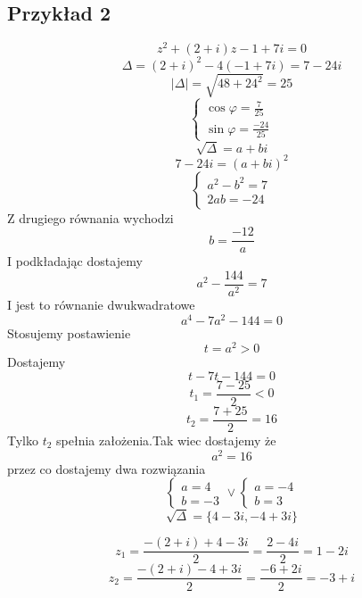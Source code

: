 \documentclass[11pt]{article}
\begin{document}
\subsection{Przykład 2}
$$ z^2 + (2 + i) z - 1 + 7i = 0 $$
$$ \Delta = ( 2 + i)^2 - 4(-1 + 7i) = 7 - 24i$$
$$ | \Delta | = \sqrt{48 + 24^2} = 25$$
$$ \begin{cases} \cos{\varphi} = \frac{7}{25} \\ \sin{\varphi} = \frac{-24}{25}\end{cases}$$
$$ \sqrt{\Delta} = a + bi $$
$$ 7 -24i = (a + bi)^2 $$
$$ \begin{cases} a^2 - b^2 = 7 \\ 2ab = - 24 \end{cases}$$
Z drugiego równania wychodzi
$$ b = \frac{-12}{a}$$
I podkładając dostajemy $$ a^2 - \frac{144}{a^2} = 7 $$
I jest to równanie dwukwadratowe
$$ a^4 - 7a^2 - 144 = 0 $$
Stosujemy postawienie
$$ t = a^2 > 0 $$
Dostajemy
$$ t - 7t - 144 = 0 $$
$$ t_1 =\frac{7-25}{2} < 0$$
$$ t_2 = \frac{ 7 + 25}{2} = 16 $$
Tylko $t_2$ spełnia założenia.Tak wiec dostajemy że $$a^2 = 16$$ przez co dostajemy dwa rozwiązania
$$ \begin{cases} a = 4 \\ b = -3 \end{cases} \vee \begin{cases} a = -4 \\ b = 3 \end{cases} $$
$$ \sqrt{\Delta} = \{ 4 - 3i , -4 + 3i \} $$

$$ z_1 = \frac{-(2+i) + 4 - 3i}{2} = \frac{2 -4i}{2} = 1 - 2i$$
$$ z_2 = \frac{ -(2 +i) -4 + 3i}{2} = \frac{-6 + 2i}{2} = -3 + i $$
\end{document}
